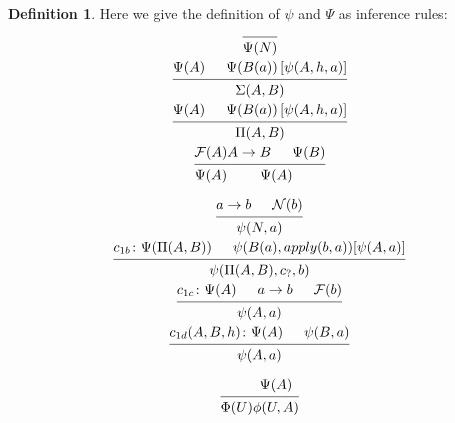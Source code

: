 \documentclass[11pt,a5paper,draft,oneside]{amsbook}
\theoremstyle{plain}%
\theoremstyle{definition}
\newtheorem{dede}{Definition}[section]
\theoremstyle{remark}
\begin{document}
	\begin{dede}
	Here we give the definition of $\psi$ and $\Psi$ as inference rules:
	\begin{gather}
	\begin{prooftree}
	\Infer{0}{\Psi(N)}
	\end{prooftree}	\\
	\begin{prooftree}
	\Hypo{\Psi(A)}
	\Hypo{\Psi(B(a)) \left[\psi(A,h,a)\right]}
	\Infer2{\Sigma(A,B)}		
	\end{prooftree}\\
	\begin{prooftree}
	\Hypo{\Psi(A)}
	\Hypo{\Psi(B(a)) \left[\psi(A,h,a)\right]}
	\Infer2{\Pi(A,B)}		
	\end{prooftree}\\
	\begin{prooftree}
	\Hypo{\mathcal{F}(A)}
	\Infer1{\Psi(A)}
	\end{prooftree}
	\begin{prooftree}
	\Hypo{A\rightarrow B}
	\Hypo{\Psi(B)}
	\Infer2{\Psi(A)}
	\end{prooftree}
	\end{gather}
	
	
	\begin{gather}
	\begin{prooftree}
	\Hypo{a \rightarrow b}
	\Hypo{\mathcal{N}(b) }
	\Infer2{\psi(N,a)}
	\end{prooftree}	
	\\
	\begin{prooftree}
		\Hypo{c_{1b} \colon \Psi(\Pi(A,B))}
		\Hypo{\psi(B(a), apply(b, a))[\psi(A,a)]}
		\Infer{2}{\psi(\Pi(A,B),c_?,b)}
	\end{prooftree}\\		
	\begin{prooftree}
	\Hypo{c_{1c} \colon \Psi(A)}
	\Hypo{a \rightarrow b}
	\Hypo{\mathcal{F}(b)}
	\Infer3{\psi(A,a)}
	\end{prooftree}	\\		
	\begin{prooftree}
	\Hypo{c_{1d}(A,B,h) \colon \Psi(A)}
	\Hypo{\psi(B,a)}
	\Infer2{\psi(A,a)}
	\end{prooftree}	
	\end{gather}
	
	\begin{gather}
	\begin{prooftree}
	\Hypo{\phantom{\Psi(A)}}
	\Infer1{\Phi(U)}
	\end{prooftree}
	\begin{prooftree}
	\Hypo{\Psi(A)}
	\Infer1{\phi(U,A)}
	\end{prooftree}	
	\end{gather}	
	
	\end{dede}
	
\end{document}
